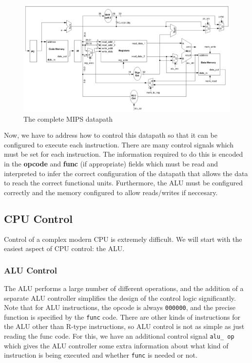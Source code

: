 \documentclass{article}
\begin{document}
	\begin{figure}[ht]
		\centering
		\includegraphics[width=\textwidth]{complete_mips_datapath}
		\caption{The complete MIPS datapath}
		\label{fig:complete mips datapath}
	\end{figure}
	
	Now, we have to address how to control this datapath so that it can be configured to execute each instruction. There are many control signals which must be set for each instruction. The information required to do this is encoded in the \textbf{opcode} and \textbf{func} (if appropriate) fields which must be read and interpreted to infer the correct configuration of the datapath that allows the data to reach the correct functional units. Furthermore, the ALU must be configured correctly and the memory configured to allow reads/writes if neccesary.		
	
	\subsection{CPU Control}
	Control of a complex modern CPU is extremely difficult. We will start with the easiest aspect of CPU control: the ALU.
	
	\subsubsection{ALU Control}
	The ALU performs a large number of different operations, and the addition of a separate ALU controller simplifies the design of the control logic significantly. Note that for ALU instructions, the opcode is always \texttt{000000}, and the precise function is specified by the \texttt{func} code. There are other kinds of instructions for the ALU other than R-type instructions, so ALU control is not as simple as just reading the func code. For this, we have an additional control signal \texttt{alu\_ op} which gives the ALU controller some extra information about what kind of instruction is being executed and whether \texttt{func} is needed or not.
	
\end{document}

